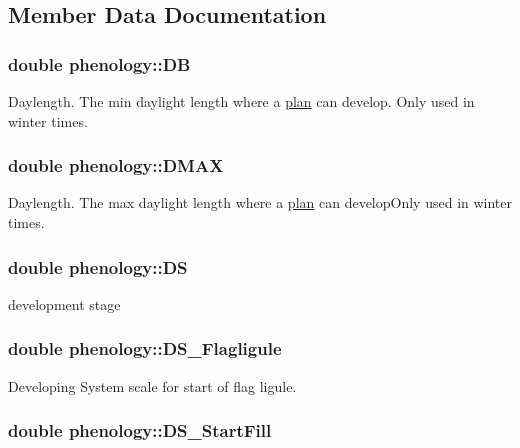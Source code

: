 \subsection{Member Data Documentation}
\hypertarget{classphenology_a93325b0130d6af4026a9630edab6bf31}{
\subsubsection[{DB}]{\setlength{\rightskip}{0pt plus 5cm}double {\bf phenology::DB}}}
\label{classphenology_a93325b0130d6af4026a9630edab6bf31}


Daylength. The min daylight length where a \hyperlink{classplan}{plan} can develop. Only used in winter times. \hypertarget{classphenology_a2d09205396bf4aa5f3d291387da6b099}{
\subsubsection[{DMAX}]{\setlength{\rightskip}{0pt plus 5cm}double {\bf phenology::DMAX}}}
\label{classphenology_a2d09205396bf4aa5f3d291387da6b099}


Daylength. The max daylight length where a \hyperlink{classplan}{plan} can developOnly used in winter times. \hypertarget{classphenology_afdc8ea11c9fcb90491341ed8e70d2927}{
\subsubsection[{DS}]{\setlength{\rightskip}{0pt plus 5cm}double {\bf phenology::DS}}}
\label{classphenology_afdc8ea11c9fcb90491341ed8e70d2927}


development stage \hypertarget{classphenology_a98fc64c780c7b1bd3ce4888a49d16dd2}{
\subsubsection[{DS\_\-Flagligule}]{\setlength{\rightskip}{0pt plus 5cm}double {\bf phenology::DS\_\-Flagligule}}}
\label{classphenology_a98fc64c780c7b1bd3ce4888a49d16dd2}


Developing System scale for start of flag ligule. \hypertarget{classphenology_aea2f0be3503256d007d5b1ee391e98e0}{
\subsubsection[{DS\_\-StartFill}]{\setlength{\rightskip}{0pt plus 5cm}double {\bf phenology::DS\_\-StartFill}}}
\label{classphenology_aea2f0be3503256d007d5b1ee391e98e0}


